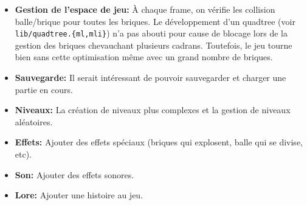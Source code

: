 \documentclass[french]{template}
\begin{document}
\begin{itemize}
    \item \textbf{Gestion de l'espace de jeu:} À chaque frame, on vérifie les collision balle/brique pour toutes les briques. Le développement d'un quadtree (voir \texttt{lib/quadtree.\{ml,mli\}}) n'a pas abouti pour cause de blocage lors de la gestion des briques chevauchant plusieurs cadrans. Toutefois, le jeu tourne bien sans cette optimisation même avec un grand nombre de briques.
    \item \textbf{Sauvegarde:} Il serait intéressant de pouvoir sauvegarder et charger une partie en cours.
    \item \textbf{Niveaux:} La création de niveaux plus complexes et la gestion de niveaux aléatoires.
    \item \textbf{Effets:} Ajouter des effets spéciaux (briques qui explosent, balle qui se divise, etc).
    \item \textbf{Son:} Ajouter des effets sonores.
    \item \textbf{Lore:} Ajouter une histoire au jeu.
\end{itemize}
\end{document}
